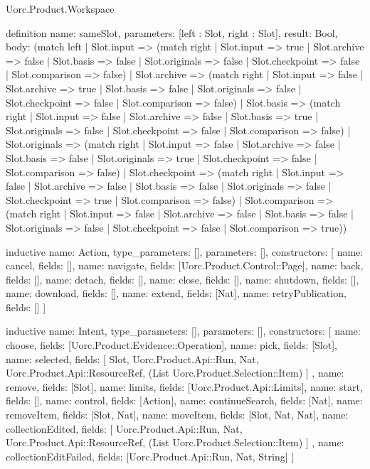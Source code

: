 \begin{lexlean}{Uorc.Product.Workspace}
\begin{semanticmodule}
definition{
  name: sameSlot,
  parameters: [left : Slot, right : Slot],
  result: Bool,
  body: (match left
    | Slot.input => (match right
      | Slot.input => true
      | Slot.archive => false
      | Slot.basis => false
      | Slot.originals => false
      | Slot.checkpoint => false
      | Slot.comparison => false)
    | Slot.archive => (match right
      | Slot.input => false
      | Slot.archive => true
      | Slot.basis => false
      | Slot.originals => false
      | Slot.checkpoint => false
      | Slot.comparison => false)
    | Slot.basis => (match right
      | Slot.input => false
      | Slot.archive => false
      | Slot.basis => true
      | Slot.originals => false
      | Slot.checkpoint => false
      | Slot.comparison => false)
    | Slot.originals => (match right
      | Slot.input => false
      | Slot.archive => false
      | Slot.basis => false
      | Slot.originals => true
      | Slot.checkpoint => false
      | Slot.comparison => false)
    | Slot.checkpoint => (match right
      | Slot.input => false
      | Slot.archive => false
      | Slot.basis => false
      | Slot.originals => false
      | Slot.checkpoint => true
      | Slot.comparison => false)
    | Slot.comparison => (match right
      | Slot.input => false
      | Slot.archive => false
      | Slot.basis => false
      | Slot.originals => false
      | Slot.checkpoint => false
      | Slot.comparison => true))
}

inductive{
  name: Action,
  type_parameters: [],
  parameters: [],
  constructors: [
    {name: cancel, fields: []},
    {name: navigate, fields: [Uorc.Product.Control::Page]},
    {name: back, fields: []},
    {name: detach, fields: []},
    {name: close, fields: []},
    {name: shutdown, fields: []},
    {name: download, fields: []},
    {name: extend, fields: [Nat]},
    {name: retryPublication, fields: []}
  ]
}

inductive{
  name: Intent,
  type_parameters: [],
  parameters: [],
  constructors: [
    {name: choose, fields: [Uorc.Product.Evidence::Operation]},
    {name: pick, fields: [Slot]},
    {
      name: selected,
      fields: [
        Slot,
        Uorc.Product.Api::Run,
        Nat,
        Uorc.Product.Api::ResourceRef,
        (List Uorc.Product.Selection::Item)
      ]
    },
    {name: remove, fields: [Slot]},
    {name: limits, fields: [Uorc.Product.Api::Limits]},
    {name: start, fields: []},
    {name: control, fields: [Action]},
    {name: continueSearch, fields: [Nat]},
    {name: removeItem, fields: [Slot, Nat]},
    {name: moveItem, fields: [Slot, Nat, Nat]},
    {
      name: collectionEdited,
      fields: [
        Uorc.Product.Api::Run,
        Nat,
        Uorc.Product.Api::ResourceRef,
        (List Uorc.Product.Selection::Item)
      ]
    },
    {name: collectionEditFailed, fields: [Uorc.Product.Api::Run, Nat, String]}
  ]
}


\end{semanticmodule}
\end{lexlean}
